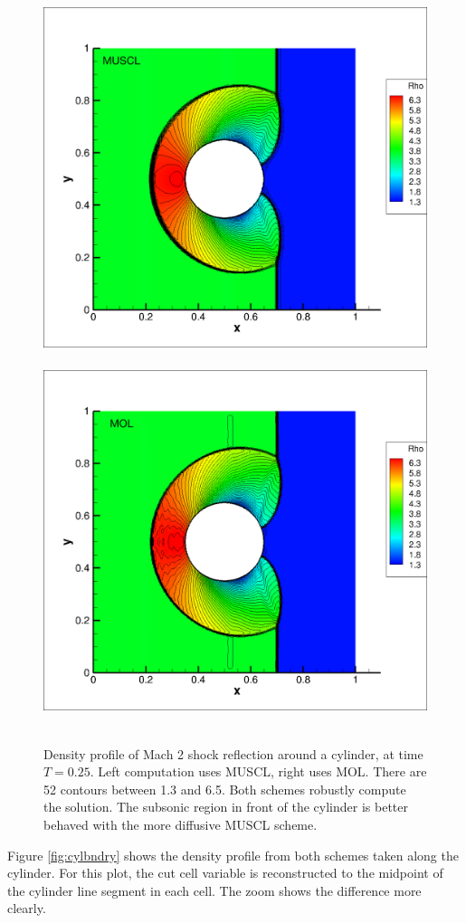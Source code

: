 \begin{figure}[h]
\centering
\vspace*{-.25in}
\hspace*{-.2in}
\mbox{
\includegraphics[width=0.50\linewidth,trim=10 10 200 10,clip]{figs/muscl_302cells.png}
\hspace*{.15in}
\includegraphics[width=0.50\linewidth,trim=10 10 200 10,clip]{figs/MOL_302cells.png}
}
\caption{\sf Density profile of Mach 2 shock reflection around a cylinder,
at time $T = 0.25$.  Left computation uses MUSCL, right uses MOL. 
There are 52 contours between 1.3 and 6.5.
Both schemes robustly compute the solution. 
The subsonic region in front of the cylinder is better behaved with the more
diffusive MUSCL scheme.
\label{fig:cyl1}}
\vspace*{-.1in}
\end{figure}

Figure \ref{fig:cylbndry}
shows the density profile from both schemes
taken along the cylinder.
For this plot, the cut cell variable is
reconstructed to the midpoint of the cylinder line segment in each  cell.  
The zoom shows the difference more
clearly.

